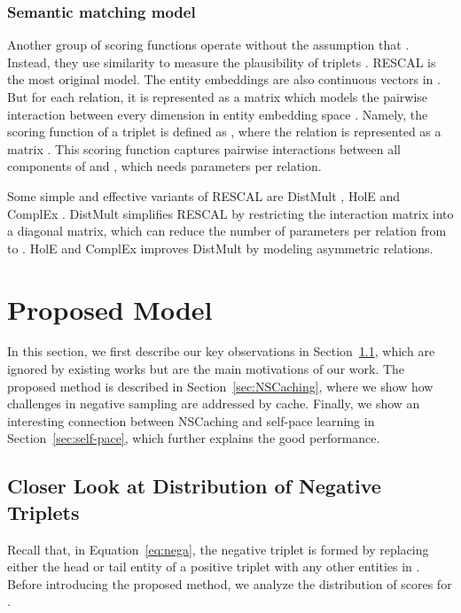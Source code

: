 \documentclass[conference]{IEEEtran}
\begin{document}
\subsubsection{Semantic matching model}
Another group of scoring functions operate without the assumption that . 
Instead, they use similarity to measure the plausibility of triplets . 
RESCAL \cite{nickel2011three} is the most original model. The entity embeddings  are also continuous vectors in . But for each relation, it is represented as a matrix which models the pairwise interaction between every dimension in entity embedding space . Namely, the scoring function of a triplet  is defined as
,
where the relation is represented as a matrix . 
This scoring function captures pairwise interactions between all components of  and , 
which needs  parameters per relation. 

Some simple and effective variants of RESCAL are DistMult \cite{yang2014embedding}, HolE \cite{nickel2016holographic} and ComplEx \cite{trouillon2016complex}. 
DistMult simplifies RESCAL by restricting the interaction matrix  into a diagonal matrix, 
which can reduce the number of parameters per relation from  to . HolE and ComplEx improves DistMult by modeling asymmetric relations. 










\section{Proposed Model}
\label{sec:proposed}


In this section,
we first describe our key observations in Section~\ref{sec:closer},
which are ignored by existing works but are the main motivations of our work.
The proposed method is described in Section~\ref{sec:NSCaching},
where we show how challenges in negative sampling are addressed by cache.
Finally,
we show an interesting connection between NSCaching and self-pace learning \cite{kumar2010self} in Section~\ref{sec:self-pace},
which further explains the good performance. 

\subsection{Closer Look at Distribution of Negative Triplets}
\label{sec:closer}



Recall that, in Equation~\eqref{eq:nega}, 
the negative triplet  is formed 
by replacing either the head or tail entity of 
a positive triplet  with any other entities in . 
Before introducing the proposed method,
we analyze the distribution of scores for .
\end{document}
